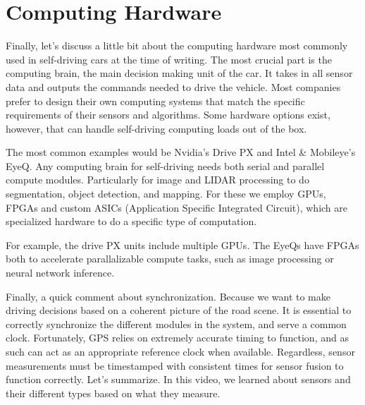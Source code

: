 \section{Computing Hardware}

Finally, let's discuss a little bit about the computing hardware most commonly used in  self-driving cars at the time of writing. The most crucial part
is the computing brain, the main decision making unit of the car. It takes in all sensor data and outputs
the commands needed to drive the vehicle. Most companies prefer to design their own
computing systems that match the specific requirements of their sensors and
algorithms. Some hardware options exist, however, that can handle self-driving
computing loads out of the box. 

The most common examples would be Nvidia's Drive PX and Intel \& Mobileye's EyeQ. Any computing brain for self-driving needs
both serial and parallel compute modules. Particularly for image and LIDAR processing to do segmentation, object detection, and mapping. 
For these we employ GPUs, FPGAs and custom ASICs (Application Specific Integrated Circuit), which are specialized hardware to
do a specific type of computation. 

For example, the drive PX units include multiple GPUs. The EyeQs have FPGAs both to
accelerate parallalizable compute tasks, such as image processing or
neural network inference. 

Finally, a quick comment about synchronization. Because we want to make driving
decisions based on a coherent picture of the road scene. It is essential to correctly synchronize
the different modules in the system, and serve a common clock. Fortunately, GPS relies on extremely
accurate timing to function, and as such can act as an appropriate
reference clock when available. Regardless, sensor measurements must be
timestamped with consistent times for sensor fusion to function correctly. Let's summarize. In this video,
we learned about sensors and their different types based
on what they measure. 


